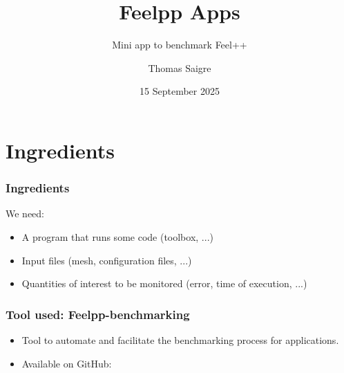 \documentclass[aspectratio=169]{beamer}
\title{Feelpp Apps}
\subtitle{Mini app to benchmark Feel++}
\date{15 September 2025}
\author{Thomas Saigre}
\institute{Cemosis, Université de Strasbourg}
\begin{document}
\maketitle


\section{Ingredients}

\begin{frame}
  \frametitle{Ingredients}

  We need:

  \begin{itemize}
    \item A program that runs some code (toolbox, ...)
    \item Input files (mesh, configuration files, ...)
    \item Quantities of interest to be monitored (error, time of execution, ...)
  \end{itemize}

\end{frame}


\begin{frame}
  \frametitle{Tool used: Feelpp-benchmarking}

  \begin{itemize}
    \item Tool to automate and facilitate the benchmarking process for applications.
    \item Available on GitHub: 
  \end{itemize}

\end{frame}
\end{document}
